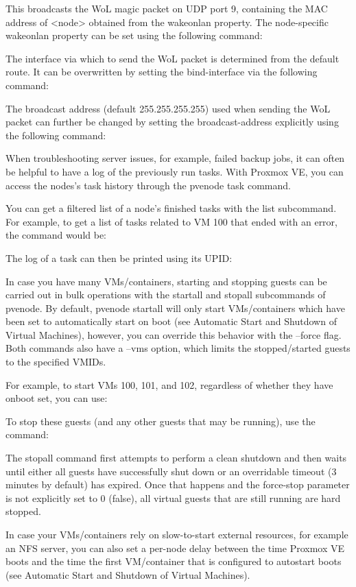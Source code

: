 This broadcasts the WoL magic packet on UDP port 9, containing the MAC address of <node> obtained from the wakeonlan property. The node-specific wakeonlan property can be set using the following command:

The interface via which to send the WoL packet is determined from the default route. It can be overwritten by setting the bind-interface via the following command:

The broadcast address (default 255.255.255.255) used when sending the WoL packet can further be changed by setting the broadcast-address explicitly using the following command:

When troubleshooting server issues, for example, failed backup jobs, it can often be helpful to have a log of the previously run tasks. With Proxmox VE, you can access the nodes’s task history through the pvenode task command.

You can get a filtered list of a node’s finished tasks with the list subcommand. For example, to get a list of tasks related to VM 100 that ended with an error, the command would be:

The log of a task can then be printed using its UPID:

In case you have many VMs/containers, starting and stopping guests can be carried out in bulk operations with the startall and stopall subcommands of pvenode. By default, pvenode startall will only start VMs/containers which have been set to automatically start on boot (see Automatic Start and Shutdown of Virtual Machines), however, you can override this behavior with the --force flag. Both commands also have a --vms option, which limits the stopped/started guests to the specified VMIDs.

For example, to start VMs 100, 101, and 102, regardless of whether they have onboot set, you can use:

To stop these guests (and any other guests that may be running), use the command:

The stopall command first attempts to perform a clean shutdown and then waits until either all guests have successfully shut down or an overridable timeout (3 minutes by default) has expired. Once that happens and the force-stop parameter is not explicitly set to 0 (false), all virtual guests that are still running are hard stopped.

In case your VMs/containers rely on slow-to-start external resources, for example an NFS server, you can also set a per-node delay between the time Proxmox VE boots and the time the first VM/container that is configured to autostart boots (see Automatic Start and Shutdown of Virtual Machines).


